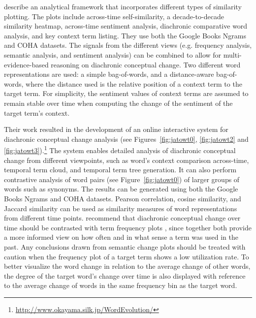 \documentclass[output=paper%
]{langsci/langscibook}
\begin{document}
\begin{sloppypar}
\citet{jatowt:2014:fas:2740769.2740809} describe an analytical framework that incorporates different types of similarity plotting. The plots include across-time self-similarity, a decade-to-decade similarity heatmap, across-time sentiment analysis, diachronic comparative word analysis, and key context term listing. They use both the Google Books Ngrams and COHA datasets. The signals from the different views (e.g. frequency analysis, semantic analysis, and sentiment analysis) can be combined to allow for multi-evidence-based reasoning on diachronic conceptual change. Two different word representations are used: a simple bag-of-words, and a distance-aware bag-of-words, where the distance used is the relative position of a context term to the target term. For simplicity, the sentiment values of context terms are assumed to remain stable over time when computing the change of the sentiment of the target term's context. 
\end{sloppypar}

Their work resulted in the development of an online interactive system for diachronic conceptual change analysis \citep{jatowt2018every} (see Figures~\ref{fig:jatowt0}, \ref{fig:jatowt2} and \ref{fig:jatowt3}).\footnote{\url{http://www.okayama.silk.jp/WordEvolution/}} The system enables detailed analysis of diachronic conceptual change from different viewpoints, such as word's context comparison across-time, temporal term cloud, and temporal term tree generation. It can also perform contrastive analysis of word pairs (see Figure~\ref{fig:jatowt0}) of larger groups of words such as synonyms. The results can be generated using both the Google Books Ngrams and COHA datasets. Pearson correlation, cosine similarity, and Jaccard similarity can be used as similarity measures of word representations from different time points. \citet{jatowt2018every} recommend that diachronic conceptual change over time should be contrasted with term frequency plots \citep[as also suggested by][]{kim-etal-2014-temporal}, since together both provide a more informed view on how often and in what sense a term was used in the past. Any conclusions drawn from semantic change plots should be treated with caution when the frequency plot of a target term shows a low utilization rate. To better visualize the word change in relation to the average change of other words, the degree of the target word's change over time is also displayed with reference to the average change of words in the same frequency bin as the target word.
\end{document}
